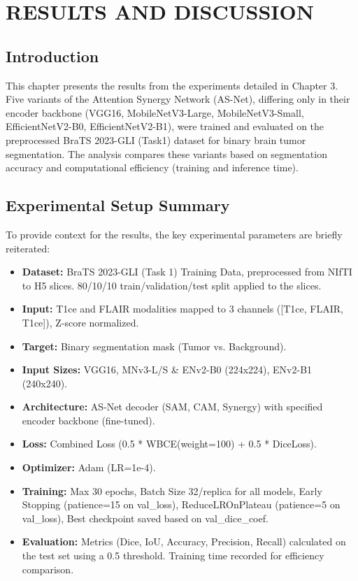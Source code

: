 \chapter{RESULTS AND DISCUSSION}

\section{Introduction}
This chapter presents the results from the experiments detailed in Chapter 3. Five variants of the Attention Synergy Network (AS-Net), differing only in their encoder backbone (VGG16, MobileNetV3-Large, MobileNetV3-Small, EfficientNetV2-B0, EfficientNetV2-B1), were trained and evaluated on the preprocessed BraTS 2023-GLI (Task1) dataset for binary brain tumor segmentation. The analysis compares these variants based on segmentation accuracy and computational efficiency (training and inference time).

\section{Experimental Setup Summary}
To provide context for the results, the key experimental parameters are briefly reiterated:
\begin{itemize}
  \item \textbf{Dataset:} BraTS 2023-GLI (Task 1) Training Data, preprocessed from NIfTI to H5 slices. 80/10/10 train/validation/test split applied to the slices.
  \item \textbf{Input:} T1ce and FLAIR modalities mapped to 3 channels ([T1ce, FLAIR, T1ce]), Z-score normalized.
  \item \textbf{Target:} Binary segmentation mask (Tumor vs. Background).
  \item \textbf{Input Sizes:} VGG16, MNv3-L/S \& ENv2-B0 (224x224), ENv2-B1 (240x240).
  \item \textbf{Architecture:} AS-Net decoder (SAM, CAM, Synergy) with specified encoder backbone (fine-tuned).
  \item \textbf{Loss:} Combined Loss (0.5 * WBCE(weight=100) + 0.5 * DiceLoss).
  \item \textbf{Optimizer:} Adam (LR=1e-4).
  \item \textbf{Training:} Max 30 epochs, Batch Size 32/replica for all models, Early Stopping (patience=15 on val\_loss), ReduceLROnPlateau (patience=5 on val\_loss), Best checkpoint saved based on val\_dice\_coef.
  \item \textbf{Evaluation:} Metrics (Dice, IoU, Accuracy, Precision, Recall) calculated on the test set using a 0.5 threshold. Training time recorded for efficiency comparison.
\end{itemize}

